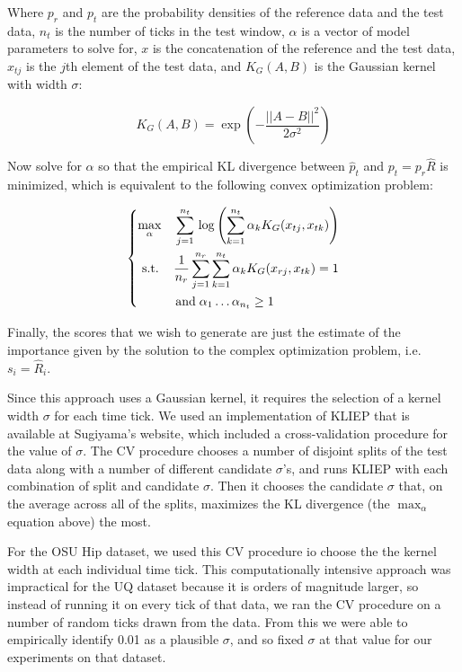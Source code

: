 Where $p_{r}$ and $p_{t}$ are the probability densities of the reference data and the test
data, $n_{t}$ is the number of ticks in the test window, $\alpha$ is a
vector of model parameters to solve for, $x$ is the concatenation of the reference and the
test data, $x_{tj}$ is the $j$th element of the test data,
and $K_G(A,B)$ is the Gaussian kernel with width $\sigma$:

\[
K_G(A,B) = \exp \left(-\frac{||A-B||^2}{2\sigma^2}\right)
\]

Now solve for $\alpha$ so that the empirical KL divergence between $\hat{p}_{t}$ and
$p_{t} = p_{r}\hat{R}$ is minimized, which is equivalent to the following convex optimization
problem:

\[
\begin{dcases}
 \max_{\alpha} \quad \sum_{j=1}^{n_t} \, \log \left( \sum_{k=1}^{n_t} \alpha_k K_G(x_{tj}, x_{tk}) \right) \\
 \,\, \text{s.t.} \quad\, \frac{1}{n_r} \sum_{j=1}^{n_r} \sum_{k=1}^{n_t} \alpha_k K_G(x_{rj},x_{tk}) = 1 \\
 \qquad \quad \text{and} \; \alpha_1 \ldots \alpha_{n_t} \ge 1
\end{dcases}
\]

Finally, the scores that we wish to generate are just the estimate of the importance given by the
solution to the complex optimization problem, i.e. $s_i = \hat{R}_i$.

Since this approach uses a Gaussian kernel, it requires the selection of
a kernel width $\sigma$ for each time tick. We used an implementation of
KLIEP that is available at Sugiyama's website, which included a cross-validation
procedure for the value of $\sigma$. The CV procedure chooses a number of disjoint
splits of the test data along with a number of different candidate $\sigma$'s, and runs
KLIEP with each combination of split and candidate $\sigma$. Then it chooses the candidate $\sigma$
that, on the average across all of the splits, maximizes the KL divergence (the
$\max_{\alpha}$ equation above) the most.

For the OSU Hip dataset, we used this CV procedure io choose the the kernel width at each individual time tick. This computationally
intensive approach was impractical for the UQ dataset because it is orders of magnitude larger,
so instead of running it on every tick of that data, we ran the CV procedure on a number of
random ticks drawn from the data. From this we were able
to empirically identify 0.01 as a plausible $\sigma$, and so fixed $\sigma$
at that value for our experiments on that dataset.

